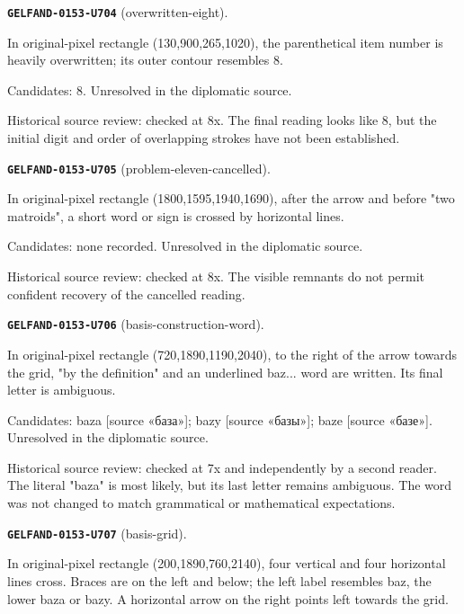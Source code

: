 \par\noindent\leavevmode{}\label{GELFAND-0153-U704}\textbf{\texttt{GELFAND-0153-U704}} (overwritten-eight).\nopagebreak[4]\par
In original-pixel rectangle (130,900,265,1020), the parenthetical item number is heavily overwritten; its outer contour resembles 8.\par
Candidates: 8. Unresolved in the diplomatic source.\par
Historical source review: checked at 8x. The final reading looks like 8, but the initial digit and order of overlapping strokes have not been established.\par\medskip
\par\noindent\leavevmode{}\label{GELFAND-0153-U705}\textbf{\texttt{GELFAND-0153-U705}} (problem-eleven-cancelled).\nopagebreak[4]\par
In original-pixel rectangle (1800,1595,1940,1690), after the arrow and before "two matroids", a short word or sign is crossed by horizontal lines.\par
Candidates: none recorded. Unresolved in the diplomatic source.\par
Historical source review: checked at 8x. The visible remnants do not permit confident recovery of the cancelled reading.\par\medskip
\par\noindent\leavevmode{}\label{GELFAND-0153-U706}\textbf{\texttt{GELFAND-0153-U706}} (basis-construction-word).\nopagebreak[4]\par
In original-pixel rectangle (720,1890,1190,2040), to the right of the arrow towards the grid, "by the definition" and an underlined baz... word are written. Its final letter is ambiguous.\par
Candidates: baza [source «база»]; bazy [source «базы»]; baze [source «базе»]. Unresolved in the diplomatic source.\par
Historical source review: checked at 7x and independently by a second reader. The literal "baza" is most likely, but its last letter remains ambiguous. The word was not changed to match grammatical or mathematical expectations.\par\medskip
\par\noindent\leavevmode{}\label{GELFAND-0153-U707}\textbf{\texttt{GELFAND-0153-U707}} (basis-grid).\nopagebreak[4]\par
In original-pixel rectangle (200,1890,760,2140), four vertical and four horizontal lines cross. Braces are on the left and below; the left label resembles baz, the lower baza or bazy. A horizontal arrow on the right points left towards the grid.\par
